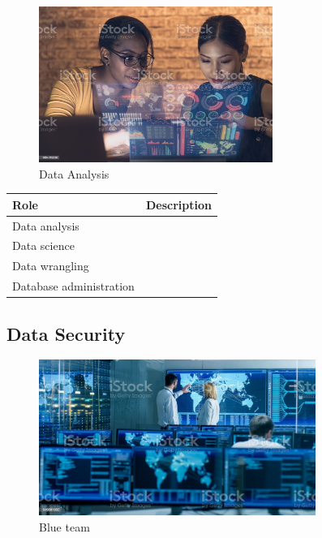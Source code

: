 \begin{figure}[H]
	\begin{center}
		\caption{Data Analysis}
		\vskip 4pt
		\includegraphics[height=2in]{images/careers/istockphoto-1364769258-1024x1024.jpg}
	\end{center}
\end{figure}

\begin{table}[H]
	\begin{center}
		\begin{tabular}{p{1.3in}|p{3in}} 
			\textbf{Role} & \textbf{Description}\\
			\hline
			Data analysis & \\
			\hline
			Data science & \\
			\hline
			Data wrangling & \\
			\hline
			Database administration & \\
		\end{tabular}
	\end{center}
\end{table}

\subsection{Data Security}

\begin{figure}[H]
	\begin{center}
		\caption{Blue team}
		\vskip 4pt
		\includegraphics[height=2in]{images/careers/istockphoto-949581032-1024x1024.jpg}
	\end{center}
\end{figure}

